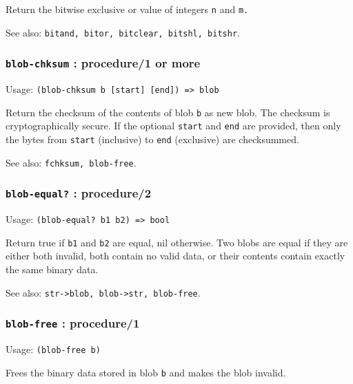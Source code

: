 \documentclass[
]{article}
\newcommand{\passthrough}[1]{#1}
\begin{document}
Return the bitwise exclusive or value of integers
\passthrough{\lstinline!n!} and \passthrough{\lstinline!m.!}

See also:
\passthrough{\lstinline!bitand, bitor, bitclear, bitshl, bitshr!}.

\hypertarget{blob-chksum-procedure1-or-more}{%
\subsubsection{\texorpdfstring{\texttt{blob-chksum} : procedure/1 or
more}{blob-chksum : procedure/1 or more}}\label{blob-chksum-procedure1-or-more}}

Usage: \passthrough{\lstinline!(blob-chksum b [start] [end]) => blob!}

Return the checksum of the contents of blob \passthrough{\lstinline!b!}
as new blob. The checksum is cryptographically secure. If the optional
\passthrough{\lstinline!start!} and \passthrough{\lstinline!end!} are
provided, then only the bytes from \passthrough{\lstinline!start!}
(inclusive) to \passthrough{\lstinline!end!} (exclusive) are
checksummed.

See also: \passthrough{\lstinline!fchksum, blob-free!}.

\hypertarget{blob-equal-procedure2}{%
\subsubsection{\texorpdfstring{\texttt{blob-equal?} :
procedure/2}{blob-equal? : procedure/2}}\label{blob-equal-procedure2}}

Usage: \passthrough{\lstinline!(blob-equal? b1 b2) => bool!}

Return true if \passthrough{\lstinline!b1!} and
\passthrough{\lstinline!b2!} are equal, nil otherwise. Two blobs are
equal if they are either both invalid, both contain no valid data, or
their contents contain exactly the same binary data.

See also: \passthrough{\lstinline!str->blob, blob->str, blob-free!}.

\hypertarget{blob-free-procedure1}{%
\subsubsection{\texorpdfstring{\texttt{blob-free} :
procedure/1}{blob-free : procedure/1}}\label{blob-free-procedure1}}

Usage: \passthrough{\lstinline!(blob-free b)!}

Frees the binary data stored in blob \passthrough{\lstinline!b!} and
makes the blob invalid.
\end{document}
